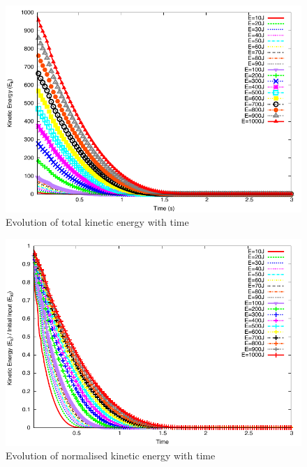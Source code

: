 \begin{figure}[tbhp]
\centering
\includegraphics[width=\textwidth]{Energy_Slope}
\caption{Evolution of total kinetic energy with time}
\label{fig:energy_slope}
\end{figure}

\begin{figure}[tbhp]
\centering
\includegraphics[width=\textwidth]{Normalised_Energy_Slope}
\caption{Evolution of normalised kinetic energy with time}
\label{fig:Normalised_Energy_Slope}
\end{figure}

